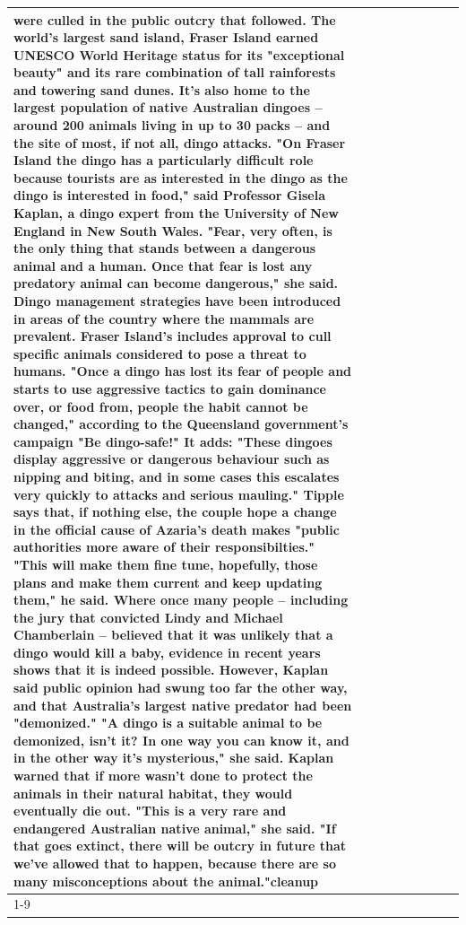 \begin{table}[H]
\begin{tabular}{lllrlllll}
were culled in the public outcry that followed. The world's largest sand island, Fraser Island earned UNESCO World Heritage status for its "exceptional beauty" and its rare combination of tall rainforests and towering sand dunes. It's also home to the largest population of native Australian dingoes -- around 200 animals living in up to 30 packs -- and the site of most, if not all, dingo attacks. "On Fraser Island the dingo has a particularly difficult role because tourists are as interested in the dingo as the dingo is interested in food," said Professor Gisela Kaplan, a dingo expert from the University of New England in New South Wales. "Fear, very often, is the only thing that stands between a dangerous animal and a human. Once that fear is lost any predatory animal can become dangerous," she said. Dingo management strategies have been introduced in areas of the country where the mammals are prevalent. Fraser Island's includes approval to cull specific animals considered to pose a threat to humans. "Once a dingo has lost its fear of people and starts to use aggressive tactics to gain dominance over, or food from, people the habit cannot be changed," according to the Queensland government's campaign "Be dingo-safe!" It adds: "These dingoes display aggressive or dangerous behaviour such as nipping and biting, and in some cases this escalates very quickly to attacks and serious mauling." Tipple says that, if nothing else, the couple hope a change in the official cause of Azaria's death makes "public authorities more aware of their responsibilties." "This will make them fine tune, hopefully, those plans and make them current and keep updating them," he said. Where once many people -- including the jury that convicted Lindy and Michael Chamberlain -- believed that it was unlikely that a dingo would kill a baby, evidence in recent years shows that it is indeed possible. However, Kaplan said public opinion had swung too far the other way, and that Australia's largest native predator had been "demonized." "A dingo is a suitable animal to be demonized, isn't it? In one way you can know it, and in the other way it's mysterious," she said. Kaplan warned that if more wasn't done to protect the animals in their natural habitat, they would eventually die out. "This is a very rare and endangered Australian native animal," she said. "If that goes extinct, there will be outcry in future that we've allowed that to happen, because there are so many misconceptions about the animal."cleanup \\
\cline{1-9}

\end{tabular}
\end{table}
